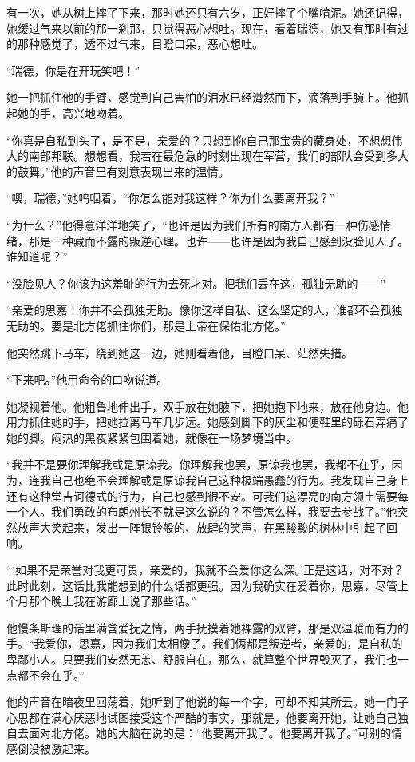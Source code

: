 \par 有一次，她从树上摔了下来，那时她还只有六岁，正好摔了个嘴啃泥。她还记得，她缓过气来以前的那一刹那，只觉得恶心想吐。现在，看着瑞德，她又有那时有过的那种感觉了，透不过气来，目瞪口呆，恶心想吐。
\par “瑞德，你是在开玩笑吧！”
\par 她一把抓住他的手臂，感觉到自己害怕的泪水已经潸然而下，滴落到手腕上。他抓起她的手，高兴地吻着。
\par “你真是自私到头了，是不是，亲爱的？只想到你自己那宝贵的藏身处，不想想伟大的南部邦联。想想看，我若在最危急的时刻出现在军营，我们的部队会受到多大的鼓舞。”他的声音里有刻意表现出来的温情。
\par “噢，瑞德，”她呜咽着，“你怎么能对我这样？你为什么要离开我？”
\par “为什么？”他得意洋洋地笑了，“也许是因为我们所有的南方人都有一种伤感情绪，那是一种藏而不露的叛逆心理。也许——也许是因为我自己感到没脸见人了。谁知道呢？”
\par “没脸见人？你该为这羞耻的行为去死才对。把我们丢在这，孤独无助的——”
\par “亲爱的思嘉！你并不会孤独无助。像你这样自私、这么坚定的人，谁都不会孤独无助的。要是北方佬抓住你们，那是上帝在保佑北方佬。”
\par 他突然跳下马车，绕到她这一边，她则看着他，目瞪口呆、茫然失措。
\par “下来吧。”他用命令的口吻说道。
\par 她凝视着他。他粗鲁地伸出手，双手放在她腋下，把她抱下地来，放在他身边。他用力抓住她的手，把她拉离马车几步远。她感到脚下的灰尘和便鞋里的砾石弄痛了她的脚。闷热的黑夜紧紧包围着她，就像在一场梦境当中。
\par “我并不是要你理解我或是原谅我。你理解我也罢，原谅我也罢，我都不在乎，因为，连我自己也绝不会理解或是原谅我自己这种极端愚蠢的行为。我发现自己身上还有这种堂吉诃德式的行为，自己也感到很不安。可我们这漂亮的南方领土需要每一个人。我们勇敢的布朗州长不就是这么说的？不管怎么样，我要去参战了。”他突然放声大笑起来，发出一阵银铃般的、放肆的笑声，在黑黢黢的树林中引起了回响。
\par “‘如果不是荣誉对我更可贵，亲爱的，我就不会爱你这么深。’正是这话，对不对？此时此刻，这话比我能想到的什么话都更强。因为我确实在爱着你，思嘉，尽管上个月那个晚上我在游廊上说了那些话。”
\par 他慢条斯理的话里满含爱抚之情，两手抚摸着她裸露的双臂，那是双温暖而有力的手。“我爱你，思嘉，因为我们太相像了。我们俩都是叛逆者，亲爱的，是自私的卑鄙小人。只要我们安然无恙、舒服自在，那么，就算整个世界毁灭了，我们也一点都不会在乎。”
\par 他的声音在暗夜里回荡着，她听到了他说的每一个字，可却不知其所云。她一门子心思都在满心厌恶地试图接受这个严酷的事实，那就是，他要离开她，让她自己独自去面对北方佬。她的大脑在说的是：“他要离开我了。他要离开我了。”可别的情感倒没被激起来。
